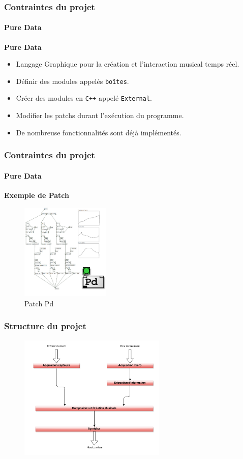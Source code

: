 \documentclass{beamer}
\begin{document}
\begin{frame}
\frametitle{Contraintes du projet}
\framesubtitle{Pure Data}
\textbf{Pure Data}
\begin{itemize}
\item Langage Graphique pour la création et l'interaction musical temps réel.
\item Définir des modules appelés \texttt{boîtes}.
\item Créer des modules en \texttt{C++} appelé \texttt{External}.
\item Modifier les patchs durant l’exécution du programme.
\item De nombreuse fonctionnalités sont déjà implémentés.
\end{itemize}
\end{frame}

\begin{frame}
\frametitle{Contraintes du projet}
\framesubtitle{Pure Data}
\textbf{Exemple de Patch}
\begin{figure}
  \centering
  \includegraphics[width=160px]{pd.jpg} 
	\caption{Patch Pd}
\end{figure}
\end{frame}

\begin{frame}
\frametitle{Structure du projet}
\begin{figure}
  \centering
  \includegraphics[height=225px]{structprojet.jpg} 
\end{figure}
\end{frame}
\end{document}
